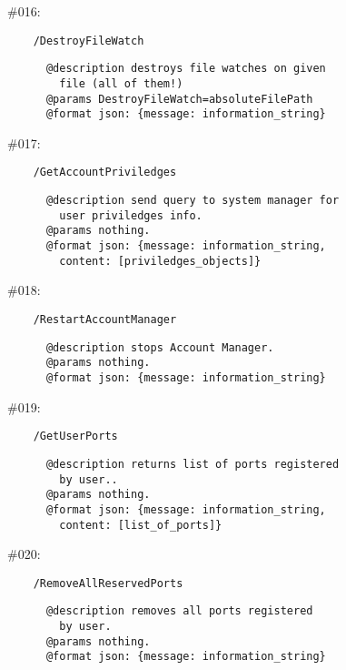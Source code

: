 \documentclass[11pt]{scrartcl}
\begin{document}
\begin{description}
    \item \#016:
      \begin{verbatim}
    /DestroyFileWatch
      \end{verbatim}
      \begin{verbatim}
      @description destroys file watches on given
        file (all of them!)
      @params DestroyFileWatch=absoluteFilePath
      @format json: {message: information_string}
      \end{verbatim}

    \item \#017:
      \begin{verbatim}
    /GetAccountPriviledges
      \end{verbatim}
      \begin{verbatim}
      @description send query to system manager for
        user priviledges info.
      @params nothing.
      @format json: {message: information_string,
        content: [priviledges_objects]}
      \end{verbatim}


    \item \#018:
      \begin{verbatim}
    /RestartAccountManager
      \end{verbatim}
      \begin{verbatim}
      @description stops Account Manager.
      @params nothing.
      @format json: {message: information_string}
      \end{verbatim}

    \item \#019:
      \begin{verbatim}
    /GetUserPorts
      \end{verbatim}
      \begin{verbatim}
      @description returns list of ports registered
        by user..
      @params nothing.
      @format json: {message: information_string,
        content: [list_of_ports]}
      \end{verbatim}

    \item \#020:
      \begin{verbatim}
    /RemoveAllReservedPorts
      \end{verbatim}
      \begin{verbatim}
      @description removes all ports registered
        by user.
      @params nothing.
      @format json: {message: information_string}
      \end{verbatim}


\end{description}
\end{document}
